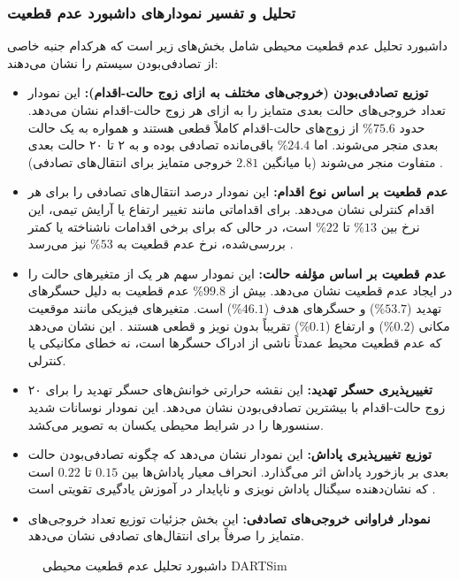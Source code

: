 \documentclass[oneside,openany,a4paper,12pt,draft]{article}
\begin{document}
\subsubsection{تحلیل و تفسیر نمودارهای داشبورد عدم قطعیت}
داشبورد تحلیل عدم قطعیت محیطی شامل بخش‌های زیر است که هرکدام جنبه خاصی از تصادفی‌بودن سیستم را نشان می‌دهند:
\begin{itemize}
    \item \textbf{توزیع تصادفی‌بودن (خروجی‌های مختلف به ازای زوج حالت-اقدام):} این نمودار تعداد خروجی‌های حالت بعدی متمایز را به ازای هر زوج حالت-اقدام نشان می‌دهد. حدود $75.6$\% از زوج‌های حالت-اقدام کاملاً قطعی هستند و همواره به یک حالت بعدی منجر می‌شوند. اما $24.4$\% باقی‌مانده تصادفی بوده و به ۲ تا ۲۰ حالت بعدی متفاوت منجر می‌شوند (با میانگین $2.81$ خروجی متمایز برای انتقال‌های تصادفی) .
    \item \textbf{عدم قطعیت بر اساس نوع اقدام:} این نمودار درصد انتقال‌های تصادفی را برای هر اقدام کنترلی نشان می‌دهد. برای اقداماتی مانند تغییر ارتفاع یا آرایش تیمی، این نرخ بین $13$\% تا $22$\% است، در حالی که برای برخی اقدامات ناشناخته یا کمتر بررسی‌شده، نرخ عدم قطعیت به $53$\% نیز می‌رسد .
    \item \textbf{عدم قطعیت بر اساس مؤلفه حالت:} این نمودار سهم هر یک از متغیرهای حالت را در ایجاد عدم قطعیت نشان می‌دهد. بیش از $99.8$\% عدم قطعیت به دلیل حسگرهای تهدید ($53.7$\%) و حسگرهای هدف ($46.1$\%) است. متغیرهای فیزیکی مانند موقعیت مکانی ($0.2$\%) و ارتفاع ($0.1$\%) تقریباً بدون نویز و قطعی هستند . این نشان می‌دهد که عدم قطعیت محیط عمدتاً ناشی از ادراک حسگرها است، نه خطای مکانیکی یا کنترلی.
    \item \textbf{تغییرپذیری حسگر تهدید:} این نقشه حرارتی خوانش‌های حسگر تهدید را برای ۲۰ زوج حالت-اقدام با بیشترین تصادفی‌بودن نشان می‌دهد. این نمودار نوسانات شدید سنسورها را در شرایط محیطی یکسان به تصویر می‌کشد.
    \item \textbf{توزیع تغییرپذیری پاداش:} این نمودار نشان می‌دهد که چگونه تصادفی‌بودن حالت بعدی بر بازخورد پاداش اثر می‌گذارد. انحراف معیار پاداش‌ها بین $0.15$ تا $0.22$ است که نشان‌دهنده سیگنال پاداش نویزی و ناپایدار در آموزش یادگیری تقویتی است .
    \item \textbf{نمودار فراوانی خروجی‌های تصادفی:} این بخش جزئیات توزیع تعداد خروجی‌های متمایز را صرفاً برای انتقال‌های تصادفی نشان می‌دهد.
\end{itemize}

\begin{figure}[H]
  \centering
  \caption{داشبورد تحلیل عدم قطعیت محیطی DARTSim}
  \label{fig:dartsim_uncertainty_overview}
\end{figure}
\end{document}
